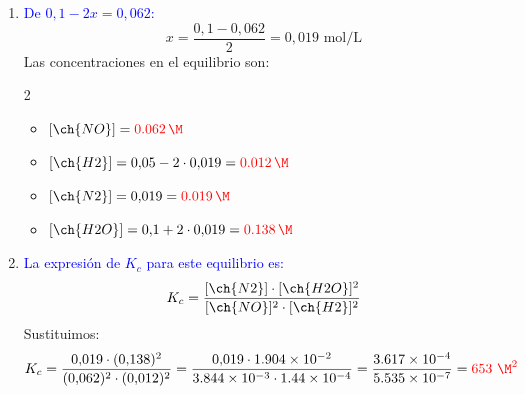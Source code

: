 \begin{exerciseEVAU}
\begin{solu}
    \begin{enumerate}[label=\letraminuscula]
        \item \textcolor{blue}{De \(0{,}1 - 2x = 0{,}062\):}
        \[
            x = \frac{0{,}1 - 0{,}062}{2} = 0{,}019 \text{ mol/L}
        \]
        Las concentraciones en el equilibrio son:
        \begin{multicols}{2}
            \begin{itemize}
                \item \([\ch{NO}] = \textcolor{red}{\qty{0{,}062}{\M}}\)
                \item \([\ch{H2}] = 0{,}05 - 2\cdot0{,}019 = \textcolor{red}{\qty{0{,}012}{\M}}\)
                \item \([\ch{N2}] = 0{,}019 = \textcolor{red}{\qty{0{,}019}{\M}}\)
                \item \([\ch{H2O}] = 0{,}1 + 2\cdot0{,}019 = \textcolor{red}{\qty{0{,}138}{\M}}\)
            \end{itemize}
        \end{multicols}

        \item \textcolor{blue}{La expresión de \(K_c\) para este equilibrio es:}
        \[
            K_c = \frac{[\ch{N2}]\cdot[\ch{H2O}]^2}{[\ch{NO}]^2\cdot[\ch{H2}]^2}
        \]
        Sustituimos:
        \[
            K_c = \frac{0{,}019\cdot(0{,}138)^2}{(0{,}062)^2\cdot(0{,}012)^2} = \frac{0{,}019\cdot\num{1{,}904e-2}}{\num{3{,}844e-3}\cdot\num{1{,}44e-4}} = \frac{\num{3{,}617e-4}}{\num{5{,}535e-7}} = \textcolor{red}{\num{653}\ \unit{\per\square\M}}
        \]
    \end{enumerate}

    \end{solu}
\end{exerciseEVAU}


